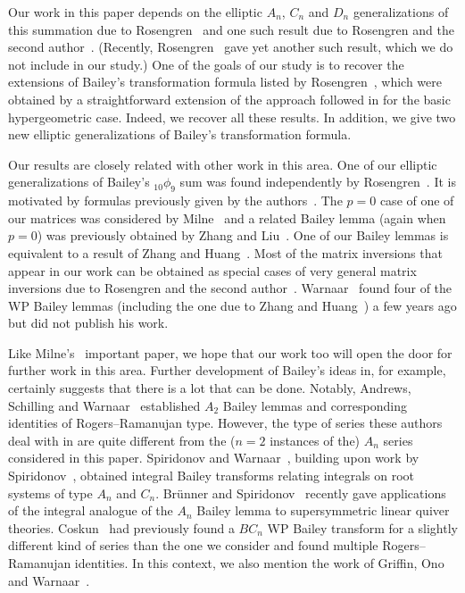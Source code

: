 \documentclass[pdftex]{sigma}
\numberwithin{equation}{section}
\begin{document}
Our work in this paper depends on the elliptic $A_n$, $C_n$ and $D_n$ generalizations of this summation due to Rosengren~\cite{HR2004} and one such result due to Rosengren and the second author~\cite{RS2017}. (Recently, Rosengren~\cite{HR2017a} gave yet another such result, which we do not include in our study.) One of the goals of our study is to recover the extensions of Bailey's transformation formula listed by Rosengren~\cite{HR2004}, which were obtained by a straightforward extension of the approach followed in \cite{BS1998} for the basic hypergeometric case. Indeed, we recover all these results. In addition, we give two new elliptic generalizations of Bailey's transformation formula.

Our results are closely related with other work in this area. One of our elliptic generalizations of Bailey's $_{10}\phi_9$ sum was found independently by Rosengren~\cite{HR-PC-2016}. It is motivated by formulas previously given by the authors~\cite{GB1995, MS2008}. The $p=0$ case of one of our matrices was considered by Milne~\cite{Milne1997} and a related Bailey lemma (again when $p=0$) was previously obtained by Zhang and Liu~\cite{ZL2016}. One of our Bailey lemmas is equivalent to a result of Zhang and Huang~\cite{ZH-preprint}. Most of the matrix inversions that appear in our work can be obtained as special cases of very general matrix inversions due to Rosengren and the second author~\cite{RS2017}.
Warnaar~\cite{SOW-notes-2016} found four of the WP Bailey lemmas (including the one due to Zhang and Huang~\cite{ZH-preprint}) a few years ago but did not publish his work.

Like Milne's~\cite{Milne1997} important paper, we hope that our work too will open the door for further work in this area. Further development of Bailey's ideas in, for example, \cite{Andrews2001,AndBer2002, Jouhet2010, MSZ2009, VPS2002, VPS2004, SSY2017, SOW2001, SOW2003} certainly suggests that there is a lot that can be done. Notably, Andrews, Schilling and Warnaar~\cite{ASW1999} established $A_2$ Bailey lemmas and
corresponding identities of Rogers--Ramanujan type. However, the type of series these authors deal with in \cite{ASW1999} are quite different from the ($n=2$ instances of the) $A_n$ series considered in this paper. Spiridonov and Warnaar~\cite{SW2006}, building upon work by Spiridonov~\cite{VPS2004}, obtained integral Bailey transforms relating integrals on root systems of type $A_n$ and $C_n$. Br\"unner and Spiridonov~\cite{BS2016} recently gave applications of the integral analogue of the $A_n$ Bailey lemma to supersymmetric linear quiver theories. Coskun~\cite{HC2008} had previously found a $BC_n$ WP Bailey transform for a slightly different kind of series than the one we consider and found multiple Rogers--Ramanujan identities. In this context, we also mention the work of Griffin, Ono and Warnaar~\cite{GOW2016}.
\end{document}
